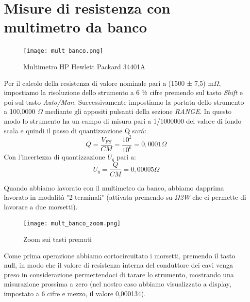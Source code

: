 \section{Misure di resistenza con multimetro da banco}
\label{sec:mult}


\begin{figure}[h]
    \centering
    \texttt{[image: mult\_banco.png]}
    \caption{Multimetro HP Hewlett Packard 34401A}
    \label{fig:mult_banco}
\end{figure}
\FloatBarrier

Per il calcolo della resistenza di valore nominale pari a (1500 ± 7,5) m$\Omega$, impostiamo la risoluzione dello strumento a 6 ½ cifre premendo sul tasto \emph{Shift} e poi sul tasto \emph{Auto/Man}. Successivamente impostiamo la portata dello strumento a 100,0000 $\Omega$ mediante gli appositi pulsanti della sezione \emph{RANGE}. In questo modo lo strumento ha un campo di misura 
pari a 1/1000000 del valore di fondo scala e quindi il passo di quantizzazione Q sar\'a: 
\begin{equation}
    Q = \frac{V_{FS}}{CM} = \frac{10^2}{10^6} = 0,0001 \Omega
\end{equation}
Con l'incertezza di quantizzazione $U_q$ pari a:
\begin{equation}
    U_q = \frac{Q}{CM} = 0,00005 \Omega
\end{equation}

Quando abbiamo lavorato con il multimetro da banco, abbiamo dapprima lavorato in modalità "2 terminali" (attivata premendo su  \emph{$\Omega$2W} che ci permette di lavorare a due morsetti).

\begin{figure}[h]
    \centering
    \texttt{[image: mult\_banco\_zoom.png]}
    \caption{Zoom sui tasti premuti}
    \label{fig:mult_banco_zoom}
\end{figure}
\FloatBarrier

Come prima operazione abbiamo cortocircuitato i morsetti, premendo il tasto null, in modo che il valore di resistenza interna del conduttore dei cavi venga preso in considerazione permettendoci di tarare lo strumento, mostrando una misurazione prossima a zero (nel nostro caso abbiamo visualizzato a display, impostato a 6 cifre e mezzo, il valore 0,000134).


